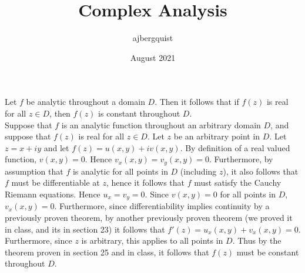 \documentclass{article}
\title{Complex Analysis}
\author{ajbergquist }
\date{August 2021}
\theoremstyle{definition}
\newcommand{\cs}[1]{\color{blue}{#1}\normalcolor}
\begin{document}
  
 Let $f$ be analytic throughout a domain $D$. Then it follows that if $f(z)$ is real for all $z\in D$, then $f(z)$ is constant throughout $D$. \\

 Suppose that $f$ is an analytic function throughout an arbitrary domain $D$, and suppose that $f(z)$ is real for all $z\in D$. Let $z$ be an arbitrary point in $D$. Let $z = x + iy$ and let $f(z) = u(x,y) + iv(x,y)$. By definition of a real valued function, $v(x,y) = 0$. Hence $v_x(x,y) = v_y(x,y)= 0.$ Furthermore, by assumption that $f$ is analytic for all points in $D$ (including $z$), it also follows that $f$ must be differentiable at $z$, hence it follows that $f$ must satisfy the Cauchy Riemann equations. Hence $u_x = v_y = 0$. Since $v(x,y) =0$ for all points in $D$, $v_x(x,y) = 0$. Furthermore, since differentiability implies continuity \cs{I don't see the relevance of continuity here.} by a previously proven theorem, by another previously proven theorem (we proved it in class, and its in section 23) it follows that $f'(z) = u_x(x,y) + v_x(x,y) = 0$. Furthermore, since $z$ is arbitrary, this applies to all points in $D$. Thus by the theorem proven in section 25 and in class, it follows that $f(z)$ must be constant throughout $D$.

\cs{5/5}
\end{document}
